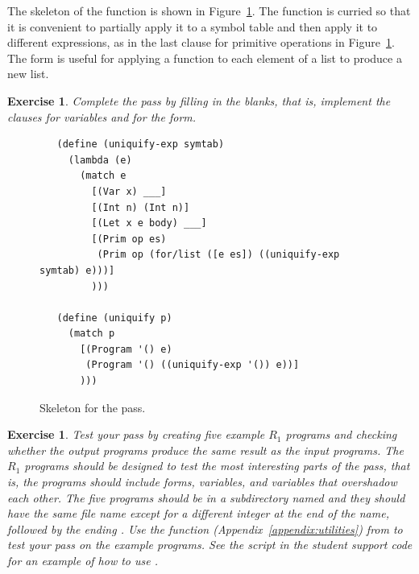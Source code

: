 \documentclass[11pt]{book}
\newtheorem{exercise}[theorem]{Exercise}
\begin{document}
The skeleton of the  function is shown in
Figure~\ref{fig:uniquify-s0}.  The function is curried so that it is
convenient to partially apply it to a symbol table and then apply it
to different expressions, as in the last clause for primitive
operations in Figure~\ref{fig:uniquify-s0}.  The \href{https://docs.racket-lang.org/reference/for.html#%28form._%28%28lib._racket%2Fprivate%2Fbase..rkt%29._for%2Flist%29%29}{\key{for/list}}
form is useful for applying a function to each element of a list to produce
a new list.

\begin{exercise}
\normalfont %

Complete the  pass by filling in the blanks, that is,
implement the clauses for variables and for the  form.
\end{exercise}

\begin{figure}[tbp]
\begin{lstlisting}
   (define (uniquify-exp symtab)
     (lambda (e)
       (match e
         [(Var x) ___]
         [(Int n) (Int n)]
         [(Let x e body) ___]
         [(Prim op es)
          (Prim op (for/list ([e es]) ((uniquify-exp symtab) e)))]
         )))

   (define (uniquify p)
     (match p
       [(Program '() e)
        (Program '() ((uniquify-exp '()) e))]
       )))
\end{lstlisting}
\caption{Skeleton for the  pass.}
\label{fig:uniquify-s0}
\end{figure}

\begin{exercise}
\normalfont %

Test your  pass by creating five example $R_1$ programs
and checking whether the output programs produce the same result as
the input programs. The $R_1$ programs should be designed to test the
most interesting parts of the  pass, that is, the
programs should include  forms, variables, and variables
that overshadow each other.  The five programs should be in a
subdirectory named  and they should have the same file name
except for a different integer at the end of the name, followed by the
ending .  Use the  function
(Appendix~\ref{appendix:utilities}) from  to test
your  pass on the example programs.  See the
 script in the student support code for an example
of how to use .

\end{exercise}
\end{document}
